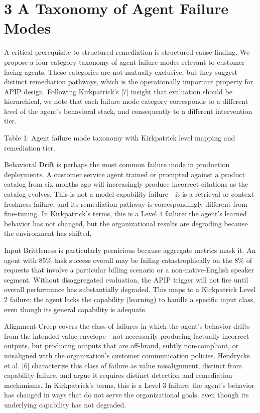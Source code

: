 \section{3  A Taxonomy of Agent Failure Modes}

A critical prerequisite to structured remediation is structured cause-finding. We propose a four-category taxonomy of agent failure modes relevant to customer-facing agents. These categories are not mutually exclusive, but they suggest distinct remediation pathways, which is the operationally important property for APIP design. Following Kirkpatrick's [7] insight that evaluation should be hierarchical, we note that each failure mode category corresponds to a different level of the agent's behavioral stack, and consequently to a different intervention tier.

Table 1: Agent failure mode taxonomy with Kirkpatrick level mapping and remediation tier.

Behavioral Drift is perhaps the most common failure mode in production deployments. A customer service agent trained or prompted against a product catalog from six months ago will increasingly produce incorrect citations as the catalog evolves. This is not a model capability failure---it is a retrieval or context freshness failure, and its remediation pathway is correspondingly different from fine-tuning. In Kirkpatrick's terms, this is a Level 4 failure: the agent's learned behavior has not changed, but the organizational results are degrading because the environment has shifted.

Input Brittleness is particularly pernicious because aggregate metrics mask it. An agent with 85\% task success overall may be failing catastrophically on the 8\% of requests that involve a particular billing scenario or a non-native-English speaker segment. Without disaggregated evaluation, the APIP trigger will not fire until overall performance has substantially degraded. This maps to a Kirkpatrick Level 2 failure: the agent lacks the capability (learning) to handle a specific input class, even though its general capability is adequate.

Alignment Creep covers the class of failures in which the agent's behavior drifts from the intended value envelope---not necessarily producing factually incorrect outputs, but producing outputs that are off-brand, subtly non-compliant, or misaligned with the organization's customer communication policies. Hendrycks et al. [6] characterize this class of failure as value misalignment, distinct from capability failure, and argue it requires distinct detection and remediation mechanisms. In Kirkpatrick's terms, this is a Level 3 failure: the agent's behavior has changed in ways that do not serve the organizational goals, even though its underlying capability has not degraded.

